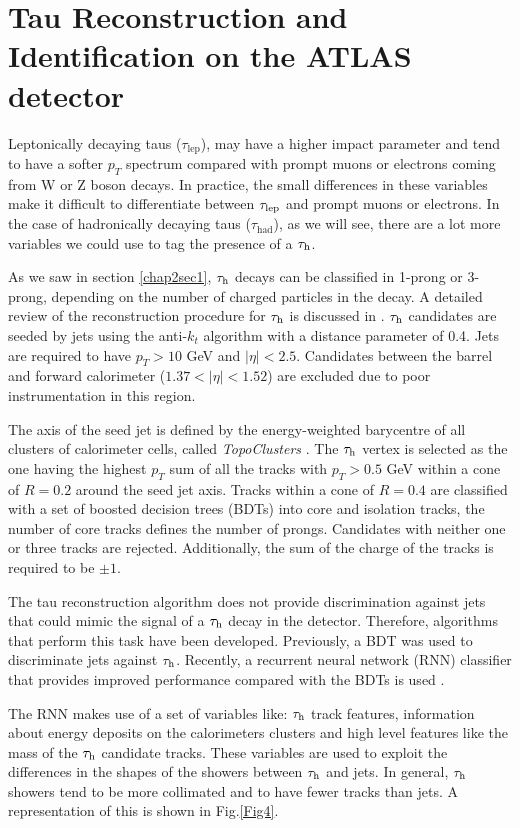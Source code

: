 \section{Tau Reconstruction and Identification on the ATLAS detector}
Leptonically decaying taus ($\tau_\text{lep}$), may have a higher impact parameter and tend to have a softer $p_T$ spectrum compared with prompt muons or electrons coming from W or Z boson decays. In practice, the small differences in these variables make it difficult to differentiate between $\tau_\text{lep}$ and prompt muons or electrons. In the case of hadronically decaying taus ($\tau_\text{had}$), as we will see, there are a lot more variables we could use to tag the presence of a $\tau_\text{h}$.

As we saw in section \ref{chap2sec1}, $\tau_\text{h}$ decays can be classified in 1-prong or 3-prong, depending on the number of charged particles in the decay. A detailed review of the reconstruction procedure for $\tau_\text{h}$ is discussed in \cite{Aad:2014rga}. $\tau_\text{h}$ candidates are seeded by jets using the anti-$k_t$ algorithm \cite{Cacciari:2008gp} with a distance parameter of 0.4. Jets are required to have $p_T>10$ GeV and $|\eta|<2.5$. Candidates between the barrel and forward calorimeter ($1.37<|\eta|<1.52$) are excluded due to poor instrumentation in this region.

The axis of the seed jet is defined by the energy-weighted barycentre of all clusters of calorimeter cells, called \textit{TopoClusters} \cite{Aad:2016upy}. The $\tau_\text{h}$ vertex is selected as the one having the highest $p_T$ sum of all the tracks with $p_T>0.5$ GeV within a cone of $R=0.2$ around the seed jet axis. Tracks within a cone of $R=0.4$ are classified with a set of boosted decision trees (BDTs) into core and isolation tracks, the number of core tracks defines the number of prongs. Candidates with neither one or three tracks are rejected. Additionally, the sum of the charge of the tracks is required to be $\pm 1$.     

The tau reconstruction algorithm does not provide discrimination against jets that could mimic the signal of a $\tau_\text{h}$ decay in the detector. Therefore, algorithms that perform this task have been developed. Previously, a BDT was used to discriminate jets against $\tau_\text{h}$. Recently, a recurrent neural network (RNN) classifier that provides improved performance compared with the BDTs is used \cite{Deutsch:2680523}.

The RNN makes use of a set of variables like: $\tau_\text{h}$ track features, information about energy deposits on the calorimeters clusters and high level features like the mass of the $\tau_\text{h}$ candidate tracks. These variables are used to exploit the differences in the shapes of the showers between $\tau_\text{h}$ and jets. In general, $\tau_\text{h}$ showers tend to be more collimated and to have fewer tracks than jets. A representation of this is shown in Fig.\ref{Fig4}. 

